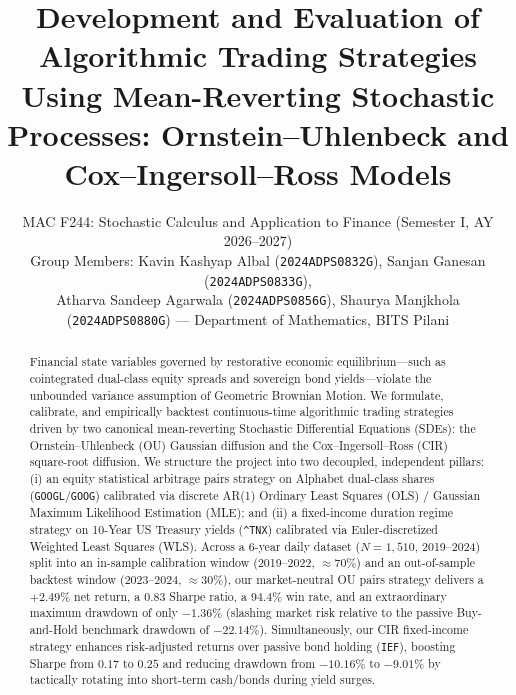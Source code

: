 \documentclass[10pt,twocolumn]{article}
\title{\vspace{-1.0em}\textbf{\Large Development and Evaluation of Algorithmic Trading Strategies Using Mean-Reverting Stochastic Processes: Ornstein--Uhlenbeck and Cox--Ingersoll--Ross Models}\vspace{-0.4em}}
\author{
\normalsize MAC F244: Stochastic Calculus and Application to Finance (Semester I, AY 2026--2027)\\
\footnotesize Group Members: Kavin Kashyap Albal (\texttt{2024ADPS0832G}), Sanjan Ganesan (\texttt{2024ADPS0833G}),\\
\footnotesize Atharva Sandeep Agarwala (\texttt{2024ADPS0856G}), Shaurya Manjkhola (\texttt{2024ADPS0880G}) --- Department of Mathematics, BITS Pilani
\vspace{-0.8em}
}
\date{}
\begin{document}
\maketitle

\begin{abstract}
\noindent Financial state variables governed by restorative economic equilibrium---such as cointegrated dual-class equity spreads and sovereign bond yields---violate the unbounded variance assumption of Geometric Brownian Motion. We formulate, calibrate, and empirically backtest continuous-time algorithmic trading strategies driven by two canonical mean-reverting Stochastic Differential Equations (SDEs): the Ornstein--Uhlenbeck (OU) Gaussian diffusion and the Cox--Ingersoll--Ross (CIR) square-root diffusion. We structure the project into two decoupled, independent pillars: (i) an equity statistical arbitrage pairs strategy on Alphabet dual-class shares (\texttt{GOOGL}/\texttt{GOOG}) calibrated via discrete AR(1) Ordinary Least Squares (OLS) / Gaussian Maximum Likelihood Estimation (MLE); and (ii) a fixed-income duration regime strategy on 10-Year US Treasury yields (\texttt{\^{}TNX}) calibrated via Euler-discretized Weighted Least Squares (WLS). Across a 6-year daily dataset ($N=1{,}510$, 2019--2024) split into an in-sample calibration window (2019--2022, $\approx 70\%$) and an out-of-sample backtest window (2023--2024, $\approx 30\%$), our market-neutral OU pairs strategy delivers a $+2.49\%$ net return, a $0.83$ Sharpe ratio, a $94.4\%$ win rate, and an extraordinary maximum drawdown of only $-1.36\%$ (slashing market risk relative to the passive Buy-and-Hold benchmark drawdown of $-22.14\%$). Simultaneously, our CIR fixed-income strategy enhances risk-adjusted returns over passive bond holding (\texttt{IEF}), boosting Sharpe from $0.17$ to $0.25$ and reducing drawdown from $-10.16\%$ to $-9.01\%$ by tactically rotating into short-term cash/bonds during yield surges.
\end{abstract}
\end{document}
